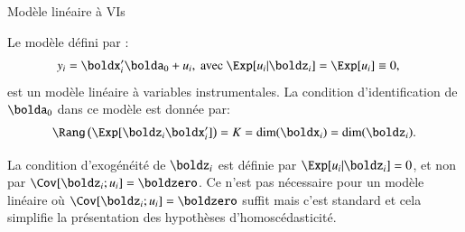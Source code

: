 \begin{frame}[allowframebreaks]{Modèle linéaire à VIs}


\begin{definition_fr}
    Le modèle défini par :
    \begin{align}
        y_i&=\boldx_i^\prime\bolda_0 + u_i, \ \text{avec} \ \Exp[u_i|\boldz_i]= \Exp[u_i]\equiv 0,
        \label{eq7}
    \end{align}
    est un modèle linéaire à variables instrumentales.
    La condition d’identification de $\bolda_0$ dans ce modèle est donnée par:
    \begin{align}
    \Rang\left(\Exp[\boldz_i\boldx_i^\prime]\right)= K = \dim(\boldx_i) =\dim(\boldz_i).
    \label{eq8}
\end{align}
\label{def3}
\end{definition_fr}

\begin{remark_fr}
    La condition d’exogénéité de $\boldz_i$ est définie par $\Exp[u_i|\boldz_i]= 0$, et non par 
    $\Cov[\boldz_i ;u_i ]= \boldzero$.
    Ce n’est pas nécessaire pour un modèle linéaire où $\Cov[\boldz_i ;u_i ]= \boldzero$ suffit
    mais c’est standard et cela simplifie la présentation des hypothèses d’homoscédasticité.
\end{remark_fr}
\end{frame}

